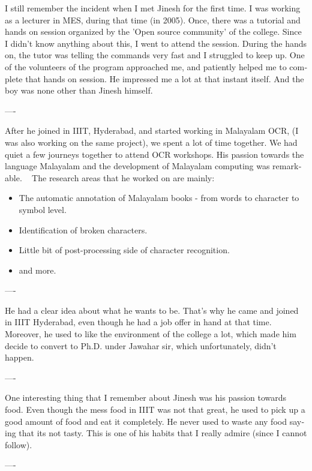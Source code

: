 \newpage
\begin{english}
I still remember the incident when I met Jinesh for the first time. I was working as a lecturer in MES, during that time (in 2005). Once, there was a tutorial and hands on session organized by the 'Open source community' of the college. Since I didn’t know anything about this, I went to attend the session. During the hands on, the tutor was telling the commands very fast and I struggled to keep up. One of the volunteers of the program approached me, and patiently helped me to complete that hands on session. He impressed me a lot at that instant itself. And the boy was none other than Jinesh himself.
\begin{center}
---- 
\end{center}
After he joined in IIIT, Hyderabad, and started working in Malayalam OCR, (I was also working on the same project), we spent a lot of time together. We had quiet a few journeys together to attend OCR workshops. His passion towards the language Malayalam and the development of Malayalam computing was remarkable.
 
The research areas that he worked on are mainly:
\begin{itemize}
\item The automatic annotation of Malayalam books - from words to character to symbol level.
\item Identification of broken characters.
\item Little bit of post-processing side of character recognition.
\item and more.
\end{itemize}
\begin{center}
---- 
\end{center}
He had a clear idea about what he wants to be. That’s why he came and joined in IIIT Hyderabad, even though he had a job offer in hand at that time. Moreover, he used to like the environment of the college a lot, which made him decide to convert to Ph.D. under Jawahar sir, which unfortunately, didn’t happen.
\begin{center}
---- 
\end{center}
One interesting thing that I remember about Jinesh was his passion towards food. Even though the mess food in IIIT was not that great, he used to pick up a good amount of food and eat it completely. He never used to waste any food saying that its not tasty. This is one of his habits that I really admire (since I cannot follow).
\begin{center}
---- 

\end{center}
\end{english}
